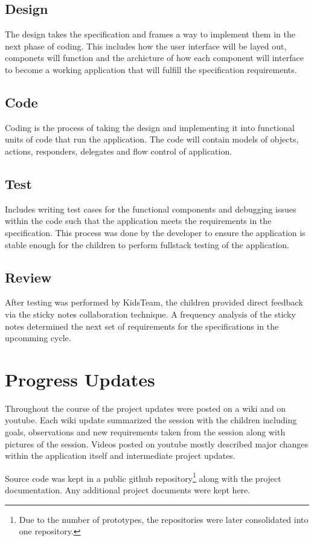 \subsection{Design}\label{sec:designphase}
 The design takes the specification and frames a way to implement them in the next phase of coding. This includes how the user interface will be layed out, componets will function and the archicture of how each component will interface to become a working application that will fulfill the specification requirements.  

\subsection{Code}\label{sec:codephase}
Coding is the process of taking the design and implementing it into functional units of code that run the application. The code will contain models of objects, actions, responders, delegates and flow control of application.

\subsection{Test}\label{sec:testphase}

Includes writing test cases for the functional components and debugging issues within the code such that the application meets the requirements in the specification. This process was done by the developer to ensure the application is stable enough for the children to perform fullstack testing of the application.

\subsection{Review}\label{sec:reviewphase}

After testing was performed by KidsTeam, the children provided direct feedback via the sticky notes collaboration technique. A frequency analysis of the sticky notes determined the next set of requirements for the specifications in the upcomming cycle. 

\section{Progress Updates}
Throughout the course of the project updates were posted on a wiki and on youtube. Each wiki update summarized the session with the children including goals, observations and new requirements taken from the session along with pictures of the session. Videos posted on youtube mostly described major changes within the application itself and intermediate project updates.

Source code was kept in a public github repository\footnote{Due to the number of prototypes, the repositories were later consolidated into one repository.} along with the project documentation. Any additional project documents were kept here. 

